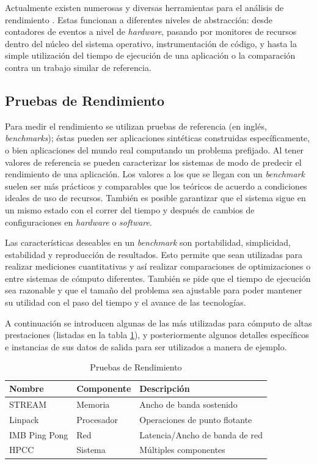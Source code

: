 \documentclass[a4paper]{report}
\begin{document}
Actualmente existen numerosas y diversas herramientas para el análisis de rendimiento \cite{gregg}. Estas funcionan a diferentes niveles de abstracción: desde contadores de eventos a nivel de {\it hardware}, pasando por monitores de recursos dentro del núcleo del sistema operativo, instrumentación de código, y hasta la simple utilización del tiempo de ejecución de una aplicación o la comparación contra un trabajo similar de referencia. 

\subsection{Pruebas de Rendimiento}

Para medir el rendimiento se utilizan pruebas de referencia (en inglés, {\em benchmarks}); éstas pueden ser aplicaciones sintéticas construidas específicamente, o bien aplicaciones del mundo real computando un problema prefijado. Al tener valores de referencia se pueden caracterizar los sistemas de modo de predecir el rendimiento de una aplicación.
Los valores a los que se llegan con un {\it benchmark} suelen ser más prácticos y comparables que los teóricos de acuerdo a condiciones ideales de uso de recursos.
También es posible garantizar que el sistema sigue en un mismo estado con el correr del tiempo y después de cambios de configuraciones en {\it hardware} o {\it software}.

\bigskip

Las características deseables en un {\it benchmark} son portabilidad, simplicidad, estabilidad y reproducción de resultados. Esto permite que sean utilizadas para realizar
mediciones cuantitativas y así realizar comparaciones de optimizaciones o entre sistemas de cómputo diferentes. También se pide que el tiempo de
ejecución sea razonable y que el tamaño del problema sea ajustable para poder mantener su utilidad con el paso del tiempo y el avance de las tecnologías.

\bigskip

A continuación se introducen algunas de las más utilizadas para cómputo de altas prestaciones (listadas en la tabla \ref{table:benchmark-list}),
y posteriormente algunos detalles específicos e instancias de sus datos de salida para ser utilizados a manera de ejemplo.

\begin{table}[H]
    \caption{Pruebas de Rendimiento}
    \centering
    \begin{tabular}{|l|l|l|}\hline
      {\bf Nombre} & {\bf Componente} & {\bf Descripción} \\ \hline
      STREAM & Memoria & Ancho de banda sostenido \\ \hline
      Linpack & Procesador & Operaciones de punto flotante \\ \hline
      IMB Ping Pong & Red & Latencia/Ancho de banda de red \\ \hline
      HPCC & Sistema & Múltiples componentes \\ \hline
        \end{tabular}
  \label{table:benchmark-list}
\end{table}
\end{document}

